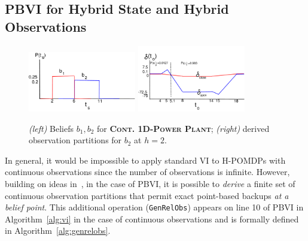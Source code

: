 \documentclass{article} %
\begin{document}
\subsection{PBVI for Hybrid State and Hybrid Observations} 
\label{sec:cont_obs}

\begin{figure}[tbp!]
\vspace{-3mm}
\centering
\hspace{-20mm}
\includegraphics[width=0.42\textwidth]{pics/beliefs_2.pdf}
\hspace{10mm}
\includegraphics[width=0.42\textwidth]{pics/delta_b2_3.pdf}
\hspace{-17mm}
\vspace{-2mm}
\caption{\footnotesize 
{\it (left)} Beliefs $b_1,b_2$ for \textsc{\bf Cont. 1D-Power Plant}; 
{\it (right)} derived observation partitions for $b_2$ at $h=2$.
}
\label{fig:beliefs}
\end{figure}

In general, it would be impossible to apply standard VI to 
H-POMDPs with continuous observations since the number of observations
is infinite.  However, building on ideas in~\cite{pascal_ijcai05},
in the case of PBVI, it is possible to \emph{derive} a finite set of
continuous observation partitions that permit exact point-based backups
\emph{at a belief point}.
This additional operation (\texttt{GenRelObs}) appears on line 10 of PBVI in 
Algorithm~\ref{alg:vi} in the case of continuous observations and is
formally defined in Algorithm~\ref{alg:genrelobs}.
\end{document}

